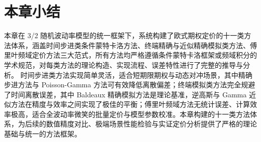 \section {本章小结}

本章在 3/2 随机波动率模型的统一框架下，系统构建了欧式期权定价的十一类方法体系，涵盖时间步进类条件蒙特卡洛方法、终端精确与近似精确模拟类方法、傅里叶频域定价方法三大范式，所有方法均严格遵循条件蒙特卡洛框架或频域积分的学术规范，对每类方法的理论构造、实现流程、误差特性进行了完整的推导与分析。
时间步进类方法实现简单灵活，适合短期限期权与动态对冲场景，其中精确步进方法与 Poisson-Gamma 方法可有效降低离散偏差；终端模拟类方法完全规避了时间离散误差，其中 Baldeaux 精确模拟方法是理论基准，逆高斯与 Gamma 近似方法在精度与效率之间实现了极佳的平衡；傅里叶频域方法无统计误差、计算效率极高，适合全波动率微笑的批量定价与模型参数校准。本章构建的十一类方法体系，为后续的数值精度对比、极端场景性能检验与实证定价分析提供了严格的理论基础与统一的方法框架。